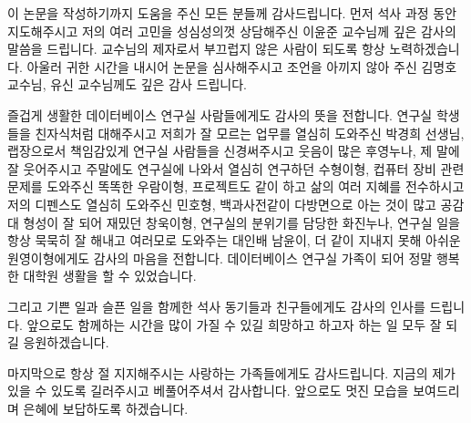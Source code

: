 \documentclass[master,english,final]{kaist-ucs}
\begin{document}

\acknowledgment[4]
    이 논문을 작성하기까지 도움을 주신 모든 분들께 감사드립니다.
    먼저 석사 과정 동안 지도해주시고 저의 여러 고민을 성심성의껏 상담해주신 이윤준 교수님께 깊은 감사의 말씀을 드립니다.
    교수님의 제자로서 부끄럽지 않은 사람이 되도록 항상 노력하겠습니다.
    아울러 귀한 시간을 내시어 논문을 심사해주시고 조언을 아끼지 않아 주신 김명호 교수님, 유신 교수님께도 깊은 감사 드립니다.

    즐겁게 생활한 데이터베이스 연구실 사람들에게도 감사의 뜻을 전합니다.
    연구실 학생들을 친자식처럼 대해주시고 저희가 잘 모르는 업무를 열심히 도와주신 박경희 선생님,
    랩장으로서 책임감있게 연구실 사람들을 신경써주시고 웃음이 많은 후영누나,
    제 말에 잘 웃어주시고 주말에도 연구실에 나와서 열심히 연구하던 수형이형,
    컵퓨터 장비 관련 문제를 도와주신 똑똑한 우람이형,
    프로젝트도 같이 하고 삶의 여러 지혜를 전수하시고 저의 디펜스도 열심히 도와주신 민호형,
    백과사전같이 다방면으로 아는 것이 많고 공감대 형성이 잘 되어 재밌던 창욱이형,
    연구실의 분위기를 담당한 화진누나,
    연구실 일을 항상 묵묵히 잘 해내고 여러모로 도와주는 대인배 남윤이,
    더 같이 지내지 못해 아쉬운 원영이형에게도 감사의 마음을 전합니다.
    데이터베이스 연구실 가족이 되어 정말 행복한 대학원 생활을 할 수 있었습니다.

    그리고 기쁜 일과 슬픈 일을 함께한 석사 동기들과 친구들에게도 감사의 인사를 드립니다.
    앞으로도 함께하는 시간을 많이 가질 수 있길 희망하고 하고자 하는 일 모두 잘 되길 응원하겠습니다.

    마지막으로 항상 절 지지해주시는 사랑하는 가족들에게도 감사드립니다.
    지금의 제가 있을 수 있도록 길러주시고 베풀어주셔서 감사합니다.
    앞으로도 멋진 모습을 보여드리며 은혜에 보답하도록 하겠습니다.

\curriculumvitae[4]

    \begin{personaldata}
    \end{personaldata}
\end{document}
